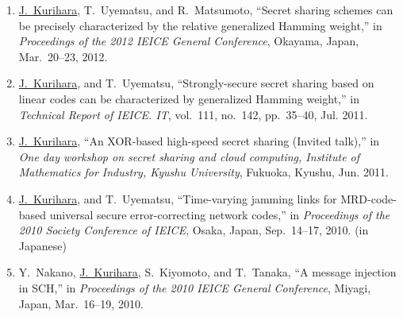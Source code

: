 \begin{enumerate}
 \item \underline{J.~Kurihara}, T.~Uyematsu, and R.~Matsumoto,
       ``Secret sharing schemes can be precisely
       characterized by the relative generalized Hamming weight,''
       in \textit{Proceedings of the 2012 IEICE General Conference},
       Okayama, Japan, Mar.~20--23, 2012.
 \item \underline{J.~Kurihara}, and T.~Uyematsu, ``Strongly-secure secret
       sharing based on linear codes can be characterized by generalized
       Hamming weight,'' in \textit{Technical Report of IEICE. IT},
       vol.~111, no.~142, pp.~35--40, Jul. 2011.
 \item \underline{J.~Kurihara}, ``An XOR-based high-speed secret sharing (Invited talk),'' in \textit{One day workshop on secret sharing and cloud computing, Institute of Mathematics for Industry, Kyushu University}, Fukuoka, Kyushu, Jun. 2011.
 \item \underline{J.~Kurihara}, and T.~Uyematsu, ``Time-varying jamming links for MRD-code-based universal secure error-correcting network codes,'' in \textit{Proceedings of the 2010 Society Conference of IEICE}, Osaka, Japan, Sep.~14--17, 2010. (in Japanese)
 \item Y.~Nakano, \underline{J.~Kurihara}, S.~Kiyomoto, and T.~Tanaka, ``A message injection in SCH,'' in \textit{Proceedings of the 2010 IEICE General Conference}, Miyagi, Japan, Mar.~16--19, 2010.


\end{enumerate}
